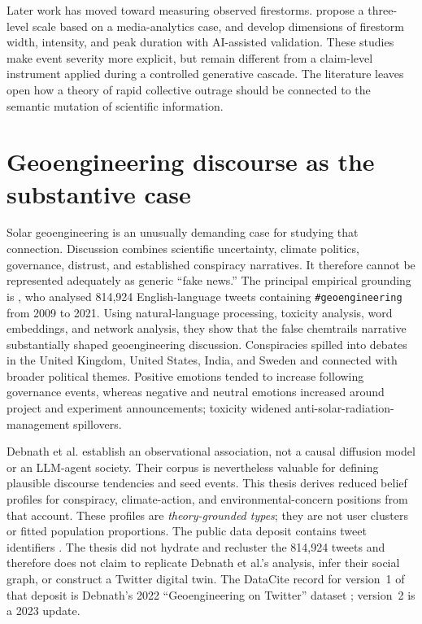 Later work has moved toward measuring observed firestorms.
\textcite{nuortimo2020scale} propose a three-level scale based on a media-analytics
case, and \textcite{nuortimo2025scale} develop dimensions of firestorm width,
intensity, and peak duration with AI-assisted validation.  These studies make
event severity more explicit, but remain different from a claim-level instrument
applied during a controlled generative cascade.  The literature leaves open how
a theory of rapid collective outrage should be connected to the semantic
mutation of scientific information.

\section{Geoengineering discourse as the substantive case}
\label{sec:lit-geoengineering}

Solar geoengineering is an unusually demanding case for studying that
connection.  Discussion combines scientific uncertainty, climate politics,
governance, distrust, and established conspiracy narratives.  It therefore
cannot be represented adequately as generic ``fake news.''  The principal
empirical grounding is \textcite{debnath2023conspiracy}, who analysed 814,924
English-language tweets containing \texttt{\#geoengineering} from 2009 to 2021.
Using natural-language processing, toxicity analysis, word embeddings, and
network analysis, they show that the false chemtrails narrative substantially
shaped geoengineering discussion.  Conspiracies spilled into debates in the
United Kingdom, United States, India, and Sweden and connected with broader
political themes.  Positive emotions tended to increase following governance
events, whereas negative and neutral emotions increased around project and
experiment announcements; toxicity widened anti-solar-radiation-management
spillovers.

Debnath et al. establish an observational association, not a causal diffusion
model or an LLM-agent society.  Their corpus is nevertheless valuable for
defining plausible discourse tendencies and seed events.  This thesis derives
reduced belief profiles for conspiracy, climate-action, and environmental-concern
positions from that account.  These profiles are \emph{theory-grounded types};
they are not user clusters or fitted population proportions.  The public data
deposit contains tweet identifiers \parencite{debnath2023dataset}.  The thesis
did not hydrate and recluster the 814,924 tweets and therefore does not claim to
replicate Debnath et al.'s analysis, infer their social graph, or construct a
Twitter digital twin. The DataCite record for version~1 of that deposit is
Debnath's 2022 ``Geoengineering on Twitter'' dataset
\parencite{debnath2022dataset}; version~2 is a 2023 update.

